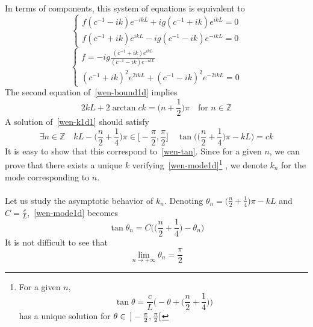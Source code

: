 In terms of components, this system of equations is equivalent to
\begin{equation*}
\begin{cases}
f(c^{-1} - ik)e^{-ikL} + ig(c^{-1} + ik)e^{ikL} = 0 \\
f(c^{-1} + ik)e^{ikL} - ig(c^{-1}- ik) e^{-ikL} = 0
\end{cases}
\end{equation*}
\ie
\begin{equation}\label{wen-bound1d}
\begin{cases}
f = -ig \frac{(c^{-1} + ik)e^{ikL}}{(c^{-1} - ik) e^{-ikL}} \\
%
(c^{-1} + ik)^2 e^{2ikL} + (c^{-1}-ik)^2 e^{-2ikL} = 0
\end{cases}
\end{equation}
The second equation of~\cref{wen-bound1d} implies
\begin{equation}\label{wen-k1d1}
2kL + 2\arctan{ck} = \big( n +\frac 1 2 \big) \pi \quad\textrm{for $n \in \mathbb Z$}
\end{equation}
A solution of~\cref{wen-k1d1} should satisfy
\begin{equation}\label{wen-mode1d}
\exists n\in \mathbb{Z}\quad
kL - \big(\frac{n}{2} + \frac 1 4 \big) \pi \in \big[-\frac{\pi}{2}, \frac{\pi}{2}\big] \quad
\tan\Big( \big(\frac{n}{2}+\frac 1 4 \big)\pi -kL \Big) = ck
\end{equation}
It is easy to show that this correspond to~\cref{wen-tan}.
Since for a given $n$, we can prove that there exists a unique $k$ verifying~\cref{wen-mode1d}\footnote{
For a given $n$, 
\begin{equation*}
\tan \theta = \frac c L \Big( -\theta + \big( \frac n 2 + \frac 1 4 \big)\Big)
\end{equation*}
has a unique solution for $\theta \in \enskip] -\frac{\pi}{2}, \frac{\pi}{2}[$
}
, we denote $k_n$ for the mode corresponding to $n$. \\\\
Let us study the asymptotic behavior of $k_n$. 
Denoting $\theta_n = \big( \frac n 2 + \frac 1 4 \big)\pi - kL$ and $C = \frac c L$,~\cref{wen-mode1d} becomes
\begin{equation}\label{wen-modetheta}
\tan \theta_n = C \Big( \big(\frac n 2 +\frac 1 4 \big) - \theta_n \Big)
\end{equation} 
It is not difficult to see that 
\begin{equation*}
\lim_{n\rightarrow+\infty}\theta_n = \frac \pi 2
\end{equation*}
